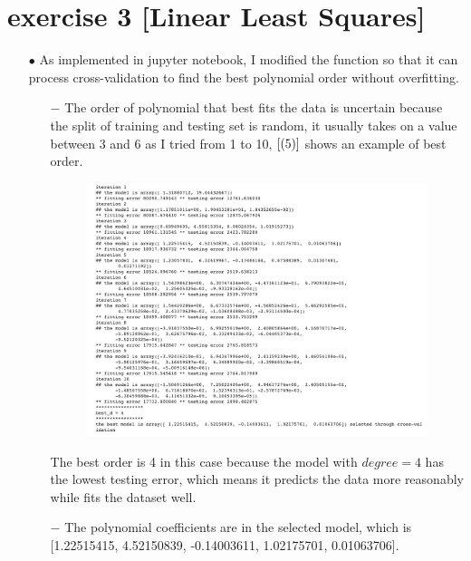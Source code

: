 \documentclass[11pt]{article}
\begin{document}
\section{exercise 3 [Linear Least Squares]}
\begin{itemize}
\item[$\bullet$] As implemented in jupyter notebook, I modified the function so that it can process cross-validation to find the best polynomial order without overfitting.
\begin{itemize}
\item[$-$]  The order of polynomial that best fits the data is uncertain because the split of training and testing set is random, it usually takes on a value between 3 and 6 as I tried from 1 to 10, $\ref{(5)}$ shows an example of best order.
\begin{figure}[htbp]
\centering
\includegraphics[width = 1.1\textwidth]{5.png}
\caption{}
\label{(5)}
\end{figure}
 
 The best order is 4 in this case because the model with $degree = 4$ has the lowest testing error, which means it predicts the data more reasonably while fits the dataset well.
 
 \item[$-$] The polynomial coefficients are in the selected model, which is [1.22515415,  4.52150839, -0.14003611,  1.02175701,  0.01063706].
 

\end{itemize}
\end{itemize}
\end{document}
